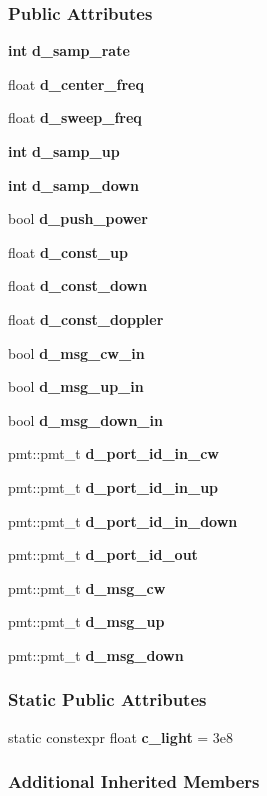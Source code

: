 \subsubsection*{Public Attributes}
\begin{DoxyCompactItemize}
\item 
{\bf int} {\bf d\+\_\+samp\+\_\+rate}
\item 
float {\bf d\+\_\+center\+\_\+freq}
\item 
float {\bf d\+\_\+sweep\+\_\+freq}
\item 
{\bf int} {\bf d\+\_\+samp\+\_\+up}
\item 
{\bf int} {\bf d\+\_\+samp\+\_\+down}
\item 
bool {\bf d\+\_\+push\+\_\+power}
\item 
float {\bf d\+\_\+const\+\_\+up}
\item 
float {\bf d\+\_\+const\+\_\+down}
\item 
float {\bf d\+\_\+const\+\_\+doppler}
\item 
bool {\bf d\+\_\+msg\+\_\+cw\+\_\+in}
\item 
bool {\bf d\+\_\+msg\+\_\+up\+\_\+in}
\item 
bool {\bf d\+\_\+msg\+\_\+down\+\_\+in}
\item 
pmt\+::pmt\+\_\+t {\bf d\+\_\+port\+\_\+id\+\_\+in\+\_\+cw}
\item 
pmt\+::pmt\+\_\+t {\bf d\+\_\+port\+\_\+id\+\_\+in\+\_\+up}
\item 
pmt\+::pmt\+\_\+t {\bf d\+\_\+port\+\_\+id\+\_\+in\+\_\+down}
\item 
pmt\+::pmt\+\_\+t {\bf d\+\_\+port\+\_\+id\+\_\+out}
\item 
pmt\+::pmt\+\_\+t {\bf d\+\_\+msg\+\_\+cw}
\item 
pmt\+::pmt\+\_\+t {\bf d\+\_\+msg\+\_\+up}
\item 
pmt\+::pmt\+\_\+t {\bf d\+\_\+msg\+\_\+down}
\end{DoxyCompactItemize}
\subsubsection*{Static Public Attributes}
\begin{DoxyCompactItemize}
\item 
static constexpr float {\bf c\+\_\+light} = 3e8
\end{DoxyCompactItemize}
\subsubsection*{Additional Inherited Members}


